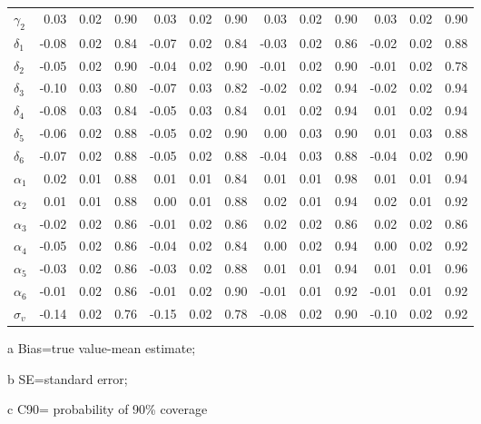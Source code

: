 \begin{center}
\begin{table}[H]
\begin{threeparttable}
\begin{tabular}{lrllrllrllrll}
  $\gamma_2$ & 0.03 & 0.02 & 0.90 & 0.03 & 0.02 & 0.90 & 0.03 & 0.02 & 0.90 & 0.03 & 0.02 & 0.90\\
  $\delta_1$ & -0.08 & 0.02 & 0.84 & -0.07 & 0.02 & 0.84 & -0.03 & 0.02 & 0.86 & -0.02 & 0.02 & 0.88\\
  $\delta_2$ & -0.05 & 0.02 & 0.90 & -0.04 & 0.02 & 0.90 & -0.01 & 0.02 & 0.90 & -0.01 & 0.02 & 0.78\\
  $\delta_3$ & -0.10 & 0.03 & 0.80 & -0.07 & 0.03 & 0.82 & -0.02 & 0.02 & 0.94 & -0.02 & 0.02 & 0.94\\
  $\delta_4$ & -0.08 & 0.03 & 0.84 & -0.05 & 0.03 & 0.84 & 0.01 & 0.02 & 0.94 & 0.01 & 0.02 & 0.94\\
  $\delta_5$ & -0.06 & 0.02 & 0.88 & -0.05 & 0.02 & 0.90 & 0.00 & 0.03 & 0.90 & 0.01 & 0.03 & 0.88\\
  $\delta_6$ & -0.07 & 0.02 & 0.88 & -0.05 & 0.02 & 0.88 & -0.04 & 0.03 & 0.88 & -0.04 & 0.02& 0.90\\
  $\alpha_1$ & 0.02 & 0.01 & 0.88 & 0.01 & 0.01 & 0.84 & 0.01 & 0.01 & 0.98 & 0.01 & 0.01 & 0.94\\
  $\alpha_2$ & 0.01 & 0.01 & 0.88 & 0.00 & 0.01 & 0.88 & 0.02 & 0.01 & 0.94 & 0.02 & 0.01 & 0.92\\
  $\alpha_3$ & -0.02 & 0.02 & 0.86 & -0.01 & 0.02 & 0.86 & 0.02 & 0.02 & 0.86 & 0.02 & 0.02 & 0.86\\
  $\alpha_4$ & -0.05 & 0.02 & 0.86 & -0.04 & 0.02 & 0.84 & 0.00 & 0.02 & 0.94 & 0.00 & 0.02 & 0.92\\
  $\alpha_5$ & -0.03 & 0.02 & 0.86 & -0.03 & 0.02 & 0.88 & 0.01 & 0.01 & 0.94 & 0.01 & 0.01 & 0.96\\
  $\alpha_6$ & -0.01 & 0.02 & 0.86 & -0.01 & 0.02 & 0.90 & -0.01 & 0.01 & 0.92 & -0.01 & 0.01 & 0.92\\
  $\sigma_v$ & -0.14 & 0.02 & 0.76 & -0.15 & 0.02 & 0.78 & -0.08 & 0.02 & 0.90 & -0.10 & 0.02 & 0.92\\
    \bottomrule
  \end{tabular}
   \begin{tablenotes}[para]
    \footnotesize
        \item[a] Bias=true value-mean estimate; \item[b] SE=standard error; \item[c] C90= probability of 90\% coverage 
    \end{tablenotes}
    \end{threeparttable}
\end {table}
\end{center}

